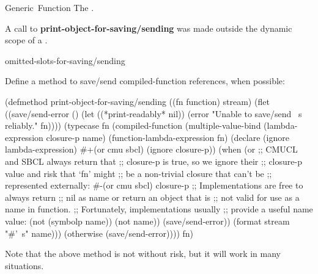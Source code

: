 \documentclass[10pt,twoside,english,pdftex]{article}
\begin{document}
\begin{functiondoc}{Generic~Function}
\fnreturns The .

\fnerrors A call to \textbf{print-object-for-saving/sending} was made
outside the dynamic scope of a
\textbf{}.

\begin{alsos}{omitted-slots-for-saving/sending}
\end{alsos}

\fnexample Define a method to save/send compiled-function references,
when possible:
\begin{example}
  (defmethod print-object-for-saving/sending ((fn function)
                                              stream)
    (flet ((save/send-error ()
             (let ((*print-readably* nil))
               (error "Unable to save/send ~s reliably." fn))))
      (typecase fn
        (compiled-function
         (multiple-value-bind (lambda-expression closure-p name)
             (function-lambda-expression fn)
           (declare (ignore lambda-expression)
                    #+(or cmu sbcl)
                    (ignore closure-p))
           (when (or 
                  ;; CMUCL and SBCL always return that
                  ;; closure-p is true, so we ignore their
                  ;; closure-p value and risk that `fn' might
                  ;; be a non-trivial closure that can't be
                  ;; represented externally:
                  #-(or cmu sbcl)
                  closure-p
                  ;; Implementations are free to always return
                  ;; nil as name or return an object that is
                  ;; not valid for use as a name in function.
                  ;; Fortunately, implementations usually
                  ;; provide a useful name value:
                  (not (symbolp name))
                  (not name))
             (save/send-error))
           (format stream "#'~s" name)))
        (otherwise (save/send-error))))
    fn)
\end{example}
Note that the above method is not without risk, but it will work in
many situations.
\end{functiondoc}

\end{document}
